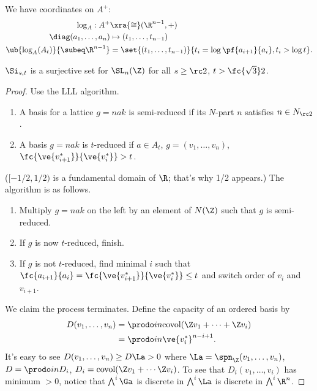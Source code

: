 We have coordinates on $A^+$:
\begin{align}
\log_A : A^+ &\xra{\cong} (\R^{n-1}, +)\\
\diag(a_1,\ldots, a_n) &\mapsto (t_1,\ldots, t_{n-1})\\
\ub{\log_A(A_t)}{\subeq \R^{n-1}} &= 
\set{(t_1,\ldots, t_{n-1})}{t_i = \log \pf{a_{i+1}}{a_i}, t_i > \log t}.
\end{align}
\begin{thm}
$\Si_{s,t}$ is a surjective set for $\SL_n(\Z)$ for all $s\ge \rc 2$, $t>\fc{\sqrt 3}2$. 
\end{thm}
\begin{proof}
Use the LLL algorithm.
\begin{df}
\begin{enumerate}
\item
A basis for a lattice $g=nak$ is semi-reduced if its $N$-part $n$ satisfies $n\in N_{\rc 2}$. 
\item
A basis $g=nak$ is $t$-reduced if $a\in A_t$, $g=(v_1,\ldots, v_n)$, $\fc{\ve{v_{i+1}^*}}{\ve{v_i^*}}>t$.  %
\end{enumerate}
\end{df}
($[-1/2,1/2)$ is a fundamental domain of $\R$; that's why 1/2 appears.)
The algorithm is as follows.
\begin{enumerate}
\item
Multiply $g=nak$ on the left by an element of $N(\Z)$ such that $g$ is semi-reduced.
\item If $g$ is now $t$-reduced, finish.
\item If $g$ is not $t$-reduced, find minimal $i$ such that $\fc{a_{i+1}}{a_i} = \fc{\ve{v_{i+1}^*}}{\ve{v_i^*}}\le t$ and switch order of $v_i$ and $v_{i+1}$. 
\end{enumerate}
We claim the process terminates. Define the capacity of an ordered basis  by
\begin{align}
D(v_1,\ldots, v_n) &= \prodo in \text{covol}(\Z v_1 + \cdots + \Z v_i)\\
&=\prodo in \ve{v_i^*}^{n-i+1}. 
\end{align}
It's easy to see $D(v_1,\ldots, v_n) \ge D \La >0$ where $\La = \spn_{\Z}(v_1,\ldots, v_n)$, $D=\prodo in D_i$, $D_i = \text{covol}(\Z v_{1}+\cdots \Z v_i)$. 
To see that $D_i(v_1,\ldots, v_i)$ has minimum $>0$, notice that $\bigwedge^i \Ga$ is discrete in $\bigwedge^i \La$ is discrete in $\bigwedge^i \R^n$.


\end{proof}
